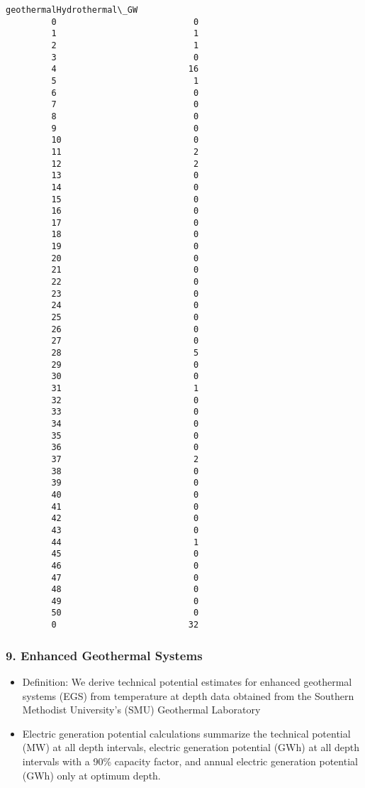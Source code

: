 \documentclass[11pt]{article}
\providecommand{\tightlist}{%
      \setlength{\itemsep}{0pt}\setlength{\parskip}{0pt}}
\begin{document}
\begin{Verbatim}[commandchars=\\\{\}]
             geothermalHydrothermal\_GW  
         0                           0  
         1                           1  
         2                           1  
         3                           0  
         4                          16  
         5                           1  
         6                           0  
         7                           0  
         8                           0  
         9                           0  
         10                          0  
         11                          2  
         12                          2  
         13                          0  
         14                          0  
         15                          0  
         16                          0  
         17                          0  
         18                          0  
         19                          0  
         20                          0  
         21                          0  
         22                          0  
         23                          0  
         24                          0  
         25                          0  
         26                          0  
         27                          0  
         28                          5  
         29                          0  
         30                          0  
         31                          1  
         32                          0  
         33                          0  
         34                          0  
         35                          0  
         36                          0  
         37                          2  
         38                          0  
         39                          0  
         40                          0  
         41                          0  
         42                          0  
         43                          0  
         44                          1  
         45                          0  
         46                          0  
         47                          0  
         48                          0  
         49                          0  
         50                          0  
         0                          32  
\end{Verbatim}
            
    \subsubsection{9. Enhanced Geothermal
Systems}\label{enhanced-geothermal-systems}

\begin{itemize}
\tightlist
\item
  Definition: We derive technical potential estimates for enhanced
  geothermal systems (EGS) from temperature at depth data obtained from
  the Southern Methodist University's (SMU) Geothermal Laboratory
\item
  Electric generation potential calculations summarize the technical
  potential (MW) at all depth intervals, electric generation potential
  (GWh) at all depth intervals with a 90\% capacity factor, and annual
  electric generation potential (GWh) only at optimum depth.
\end{itemize}
\end{document}
